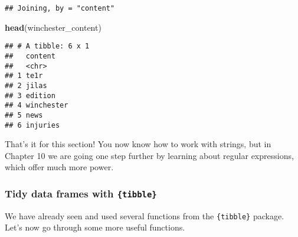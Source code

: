 \documentclass[
]{article}
\newenvironment{Shaded}{\begin{snugshade}}{\end{snugshade}}
\newcommand{\DecValTok}[1]{\textcolor[rgb]{0.00,0.00,0.81}{#1}}
\newcommand{\KeywordTok}[1]{\textcolor[rgb]{0.13,0.29,0.53}{\textbf{#1}}}
\newcommand{\NormalTok}[1]{#1}
\newcommand{\OperatorTok}[1]{\textcolor[rgb]{0.81,0.36,0.00}{\textbf{#1}}}
\newcommand{\StringTok}[1]{\textcolor[rgb]{0.31,0.60,0.02}{#1}}
\begin{document}
\begin{Shaded}
\end{Shaded}

\begin{verbatim}
## Joining, by = "content"
\end{verbatim}

\begin{Shaded}
\begin{Highlighting}[]
\KeywordTok{head}\NormalTok{(winchester\_content)}
\end{Highlighting}
\end{Shaded}

\begin{verbatim}
## # A tibble: 6 x 1
##   content   
##   <chr>     
## 1 te1r      
## 2 jilas     
## 3 edition   
## 4 winchester
## 5 news      
## 6 injuries
\end{verbatim}

That's it for this section! You now know how to work with strings, but in Chapter 10 we are going
one step further by learning about regular expressions, which offer much more power.

\hypertarget{tidy-data-frames-with-tibble}{%
\subsubsection{\texorpdfstring{Tidy data frames with \texttt{\{tibble\}}}{Tidy data frames with \{tibble\}}}\label{tidy-data-frames-with-tibble}}

We have already seen and used several functions from the \texttt{\{tibble\}} package. Let's now go through
some more useful functions.
\end{document}
